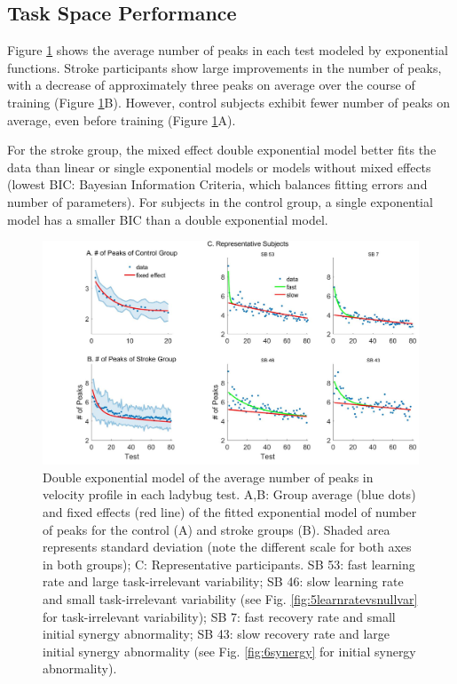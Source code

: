 \subsection{Task Space Performance}

Figure \ref{fig:3nopfixran} shows the average number of peaks in each test modeled by exponential functions. 
Stroke participants show large improvements in the number of peaks, with a decrease of approximately three peaks on average over the course of training (Figure \ref{fig:3nopfixran}B). 
However, control subjects exhibit fewer number of peaks on average, even before training (Figure \ref{fig:3nopfixran}A).

For the stroke group, the mixed effect double exponential model better fits the data than linear or single exponential models or models without mixed effects (lowest BIC: Bayesian Information Criteria, which balances fitting errors and number of parameters). 
For subjects in the control group, a single exponential model has a smaller BIC than a double exponential model.

\begin{figure}
	\centering
	\includegraphics[width=1\linewidth]{figures/3nopFixRan}
	\caption[Double Exponential Model]
	{Double exponential model of the average number of peaks in velocity profile in each ladybug test. 
		A,B: Group average (blue dots) and fixed effects (red line) of the fitted exponential model of number of peaks for the control (A) and stroke groups (B). Shaded area represents standard deviation (note the different scale for both axes in both groups); 
		C: Representative participants. 
		SB 53: fast learning rate and large task-irrelevant variability; 
		SB 46: slow learning rate and small task-irrelevant variability (see Fig. \ref{fig:5learnratevsnullvar} for task-irrelevant variability);
		SB 7: fast recovery rate and small initial synergy abnormality;
		SB 43: slow recovery rate and large initial synergy abnormality (see Fig. \ref{fig:6synergy} for initial synergy abnormality).
	}
	\label{fig:3nopfixran}
\end{figure}

